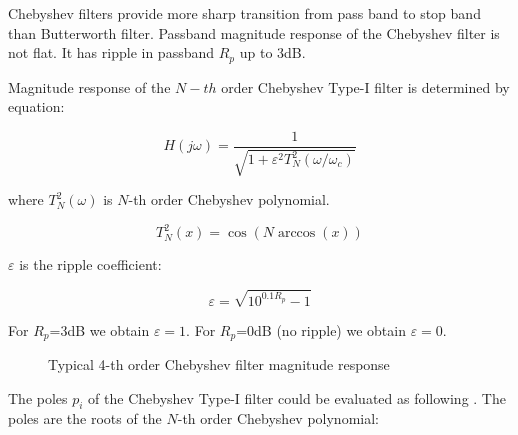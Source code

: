 Chebyshev filters provide more sharp transition from pass band
to stop band than Butterworth filter.  Passband magnitude response 
of the Chebyshev filter is not flat. It has ripple in passband $R_p$ up to
3dB. 

Magnitude response of the $N-th$ order Chebyshev Type-I filter is determined by
equation:

\begin{equation}
 H(j\omega) = \frac{1}{\sqrt{1+\varepsilon^2 T^2_N(\omega/\omega_c)}}
\end{equation}

where $T^2_N(\omega)$ is $N$-th order Chebyshev polynomial.

\begin{equation}
 T^2_N(x) = \cos(N\arccos(x)) \label{cheb-poly}
\end{equation}

$\varepsilon$ is the ripple coefficient:

\begin{equation}
 \varepsilon = \sqrt{10^{0.1R_p}-1} \label{eps}
\end{equation}

For $R_p$=3dB we obtain $\varepsilon=1$. For $R_p$=0dB (no ripple) we obtain
$\varepsilon=0$. 


\begin{figure}[!ht]
  \centering
  \caption{Typical 4-th order Chebyshev filter magnitude response}
  \label{fig:cheb}
\end{figure}

The poles $p_i$ of the Chebyshev Type-I filter could be evaluated as following 
\cite{Hamming}. The poles are the roots of the $N$-th order Chebyshev 
polynomial:

